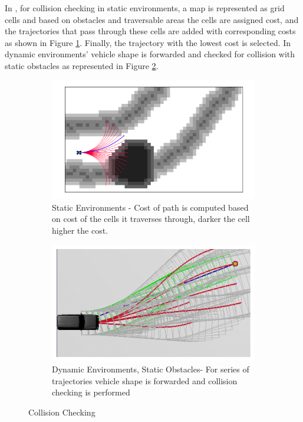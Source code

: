 In \cite{kolski_thesis}, for collision checking in static environments, a map is represented as grid cells and based on obstacles and traversable areas the cells are assigned cost, and the trajectories that pass through these cells are added with corresponding costs as shown in Figure \ref{kolski1}. Finally, the trajectory with the lowest cost is selected. In dynamic environments' vehicle shape is forwarded and checked for collision with static obstacles as represented in Figure \ref{kolski2}.
\begin{figure}
	\centering
	\begin{subfigure}{.50\textwidth}
		\centering
		\includegraphics[width=1.0\linewidth]{Images/related_work/kolskistaticobst.png}
		\caption{Static Environments - Cost of path is computed based on cost of the cells it traverses through, darker the cell higher the cost.}
		\label{kolski1}
	\end{subfigure}%
	\begin{subfigure}{.50\textwidth}
		\centering
		\includegraphics[width=1.0\linewidth]{Images/related_work/dynamiccollsionkolski.png}
		\caption{Dynamic Environments, Static Obstacles- For series of trajectories vehicle shape is forwarded and collision checking is performed}
		\label{kolski2}
	\end{subfigure}
	\caption{Collision Checking \cite{kolski_thesis}}
	\label{kolskicollison}
\end{figure}

